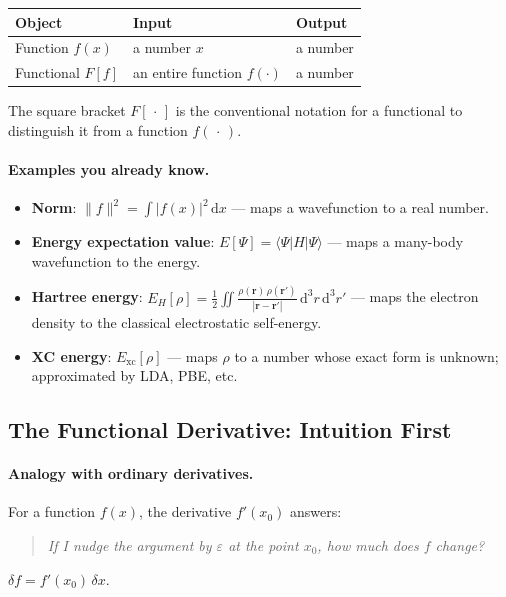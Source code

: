 \documentclass[12pt,letterpaper]{article}
\newcommand{\dd}{\mathrm{d}}
\newcommand{\Exc}{E_{\mathrm{xc}}}
\theoremstyle{definition}
\begin{document}
\begin{center}
\begin{tabular}{lll}
\toprule
Object & Input & Output \\
\midrule
Function $f(x)$ & a number $x$ & a number \\
Functional $F[f]$ & an entire function $f(\cdot)$ & a number \\
\bottomrule
\end{tabular}
\end{center}

\noindent The square bracket $F[\,\cdot\,]$ is the conventional notation for a
functional to distinguish it from a function $f(\,\cdot\,)$.

\paragraph{Examples you already know.}
\begin{itemize}[leftmargin=*]
  \item \textbf{Norm}: $\|f\|^2 = \int |f(x)|^2\,\dd x$ --- maps a wavefunction to a
    real number.
  \item \textbf{Energy expectation value}: $E[\Psi] = \langle\Psi|H|\Psi\rangle$ ---
    maps a many-body wavefunction to the energy.
  \item \textbf{Hartree energy}: $E_H[\rho] = \tfrac{1}{2}\iint
    \frac{\rho(\bm{r})\,\rho(\bm{r}')}{|\bm{r}-\bm{r}'|}\,\dd^3r\,\dd^3r'$ ---
    maps the electron density to the classical electrostatic self-energy.
  \item \textbf{XC energy}: $\Exc[\rho]$ --- maps $\rho$ to a number whose exact
    form is unknown; approximated by LDA, PBE, etc.
\end{itemize}

\subsection{The Functional Derivative: Intuition First}

\paragraph{Analogy with ordinary derivatives.}
For a function $f(x)$, the derivative $f'(x_0)$ answers:
\begin{quote}
  \textit{If I nudge the argument by $\varepsilon$ at the point $x_0$,
  how much does $f$ change?}
\end{quote}
$\delta f = f'(x_0)\,\delta x$.
\end{document}
